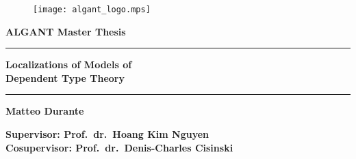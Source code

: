 \thispagestyle{empty}
\begin{titlepage}
  \begin{center}
    \begin{figure}[h!]
      \centering
      \texttt{[image: algant\_logo.mps]}
    \end{figure}
    \vspace{0.4cm}
    \fontsize{15pt}{0.6cm}\selectfont
    {\textbf{ALGANT Master Thesis}}
    \vspace{0.2cm}
    \rule{\linewidth}{0.3mm}
    
    \vspace{0.05cm}
    \Huge{\textbf{Localizations of Models of
        \\ %
        Dependent Type Theory}}\\
    \vspace{0.05cm}
    
    \rule{\linewidth}{0.3mm}
    
    \vspace{0.1cm}
    
    \large{\textbf{Matteo Durante}}\\
    \vspace{0.1cm}
    
    \large{\textbf{Supervisor: Prof.\ dr.\ Hoang Kim Nguyen}} \\
    \vspace{0.1cm}
    \large{\textbf{Cosupervisor: Prof.\ dr.\ Denis-Charles Cisinski}}
    
    \vfill
    

\end{center}
\end{titlepage}
